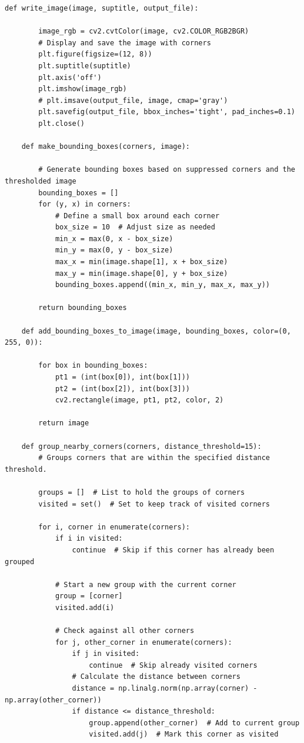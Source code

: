 \documentclass[11pt, conference, letterpaper]{IEEEtran}
\begin{document}
\begin{lstlisting}[style=python, caption={\texttt{plot\_utils.py}}, label={lst:putils}]
    def write_image(image, suptitle, output_file):
        
        image_rgb = cv2.cvtColor(image, cv2.COLOR_RGB2BGR)
        # Display and save the image with corners
        plt.figure(figsize=(12, 8))
        plt.suptitle(suptitle)
        plt.axis('off')
        plt.imshow(image_rgb)
        # plt.imsave(output_file, image, cmap='gray')
        plt.savefig(output_file, bbox_inches='tight', pad_inches=0.1)
        plt.close() 
            
    def make_bounding_boxes(corners, image):
    
        # Generate bounding boxes based on suppressed corners and the thresholded image
        bounding_boxes = []
        for (y, x) in corners:
            # Define a small box around each corner
            box_size = 10  # Adjust size as needed
            min_x = max(0, x - box_size)
            min_y = max(0, y - box_size)
            max_x = min(image.shape[1], x + box_size)
            max_y = min(image.shape[0], y + box_size)
            bounding_boxes.append((min_x, min_y, max_x, max_y))
    
        return bounding_boxes
    
    def add_bounding_boxes_to_image(image, bounding_boxes, color=(0, 255, 0)):
        
        for box in bounding_boxes:
            pt1 = (int(box[0]), int(box[1]))
            pt2 = (int(box[2]), int(box[3]))
            cv2.rectangle(image, pt1, pt2, color, 2)
            
        return image
    
    def group_nearby_corners(corners, distance_threshold=15):
        # Groups corners that are within the specified distance threshold.
    
        groups = []  # List to hold the groups of corners
        visited = set()  # Set to keep track of visited corners
        
        for i, corner in enumerate(corners):
            if i in visited:
                continue  # Skip if this corner has already been grouped
            
            # Start a new group with the current corner
            group = [corner]
            visited.add(i)
            
            # Check against all other corners
            for j, other_corner in enumerate(corners):
                if j in visited:
                    continue  # Skip already visited corners
                # Calculate the distance between corners
                distance = np.linalg.norm(np.array(corner) - np.array(other_corner))
                if distance <= distance_threshold:
                    group.append(other_corner)  # Add to current group
                    visited.add(j)  # Mark this corner as visited
            

\end{lstlisting}
\end{document}
